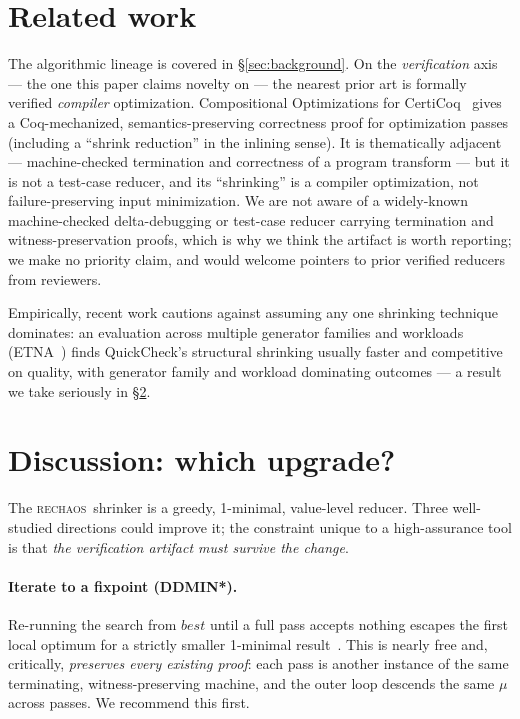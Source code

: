 \documentclass[10pt,twocolumn,letterpaper]{article}
\newcommand{\rc}{\textsc{rechaos}}
\begin{document}
\section{Related work}\label{sec:related}
The algorithmic lineage is covered in \S\ref{sec:background}. On the
\emph{verification} axis --- the one this paper claims novelty on --- the nearest
prior art is formally verified \emph{compiler} optimization. Compositional
Optimizations for CertiCoq~\cite{paraskevopoulou2021certicoq} gives a
Coq-mechanized, semantics-preserving correctness proof for optimization passes
(including a ``shrink reduction'' in the inlining sense). It is thematically
adjacent --- machine-checked termination and correctness of a program transform
--- but it is not a test-case reducer, and its ``shrinking'' is a compiler
optimization, not failure-preserving input minimization. We are not aware of a
widely-known machine-checked delta-debugging or test-case reducer carrying
termination and witness-preservation proofs, which is why we think the artifact
is worth reporting; we make no priority claim, and would welcome pointers to
prior verified reducers from reviewers.

Empirically, recent work cautions against assuming any one shrinking technique
dominates: an evaluation across multiple generator families and workloads
(ETNA~\cite{etna2026shrinking}) finds QuickCheck's structural shrinking usually
faster and competitive on quality, with generator family and workload dominating
outcomes --- a result we take seriously in \S\ref{sec:discussion}.

\section{Discussion: which upgrade?}\label{sec:discussion}
The \rc\ shrinker is a greedy, 1-minimal, value-level reducer. Three well-studied
directions could improve it; the constraint unique to a high-assurance tool is
that \emph{the verification artifact must survive the change}.

\paragraph{Iterate to a fixpoint (DDMIN*).}
Re-running the search from $\mathit{best}$ until a full pass accepts nothing
escapes the first local optimum for a strictly smaller 1-minimal
result~\cite{vince2022iterating}. This is nearly free and, critically,
\emph{preserves every existing proof}: each pass is another instance of the same
terminating, witness-preserving machine, and the outer loop descends the same
$\mu$ across passes. We recommend this first.
\end{document}
